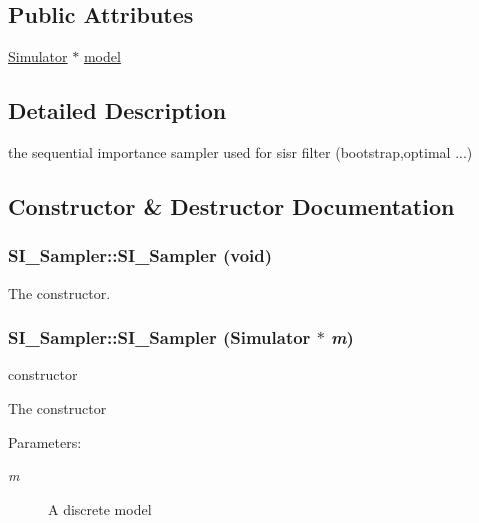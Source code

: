 \subsection*{Public Attributes}
\begin{CompactItemize}
\item 
\hyperlink{class_simulator}{Simulator} $\ast$ \hyperlink{class_s_i___sampler_b79ecd357866d7ed5ab1867c4a5633e7}{model}
\end{CompactItemize}


\subsection{Detailed Description}
the sequential importance sampler used for sisr filter (bootstrap,optimal ...) 



\subsection{Constructor \& Destructor Documentation}
\hypertarget{class_s_i___sampler_34229c2cf9f69118ef54233deaed943e}{
\subsubsection[{SI\_\-Sampler}]{\setlength{\rightskip}{0pt plus 5cm}SI\_\-Sampler::SI\_\-Sampler (void)}}
\label{class_s_i___sampler_34229c2cf9f69118ef54233deaed943e}


The constructor. 

\hypertarget{class_s_i___sampler_3d6f1ddcca06c4e086b4af48e0b68645}{
\subsubsection[{SI\_\-Sampler}]{\setlength{\rightskip}{0pt plus 5cm}SI\_\-Sampler::SI\_\-Sampler ({\bf Simulator} $\ast$ {\em m})}}
\label{class_s_i___sampler_3d6f1ddcca06c4e086b4af48e0b68645}


constructor 

The constructor \begin{Desc}
\item[Parameters:]
\begin{description}
\item[{\em m}]A discrete model \end{description}
\end{Desc}


